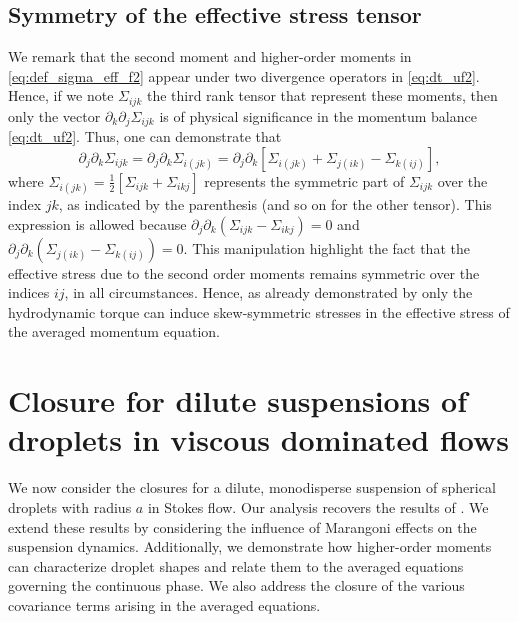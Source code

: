 \subsection{Symmetry of the effective stress tensor}
We remark that the second moment and higher-order moments in \ref{eq:def_sigma_eff_f2} appear under two divergence operators in \ref{eq:dt_uf2}. 
Hence, if we note $\Sigma_{ijk}$ the third rank tensor that represent these moments, then only the vector $\partial_k \partial_j\Sigma_{ijk}$ is of physical significance in the momentum balance \eqref{eq:dt_uf2}.
Thus, one can demonstrate that \citep{lhuillier1996contribution}
\begin{equation}
    \partial_j \partial_k \Sigma_{ijk}
    = \partial_j \partial_k \Sigma_{i(jk)}
    =
    \partial_j \partial_k \left[
        \Sigma_{i(jk)}
        + \Sigma_{j(ik)}
        - \Sigma_{k(ij)}
    \right],
    \label{eq:sym_proof}
\end{equation}
where $\Sigma_{i(jk)} = \frac{1}{2}[\Sigma_{ijk} + \Sigma_{ikj}]$ represents the symmetric part of $\Sigma_{ijk}$ over the index $jk$, as indicated by the parenthesis (and so on for the other tensor). 
This expression is allowed because $\partial_j \partial_k (\Sigma_{ijk} - \Sigma_{ikj}) = 0$ and $\partial_j \partial_k (\Sigma_{j(ik)} - \Sigma_{k(ij)}) = 0$. 
This manipulation highlight the fact that the effective stress due to the second order moments remains symmetric over the indices $ij$, in all circumstances.
Hence, as already demonstrated by \citet{lhuillier1996contribution} only the hydrodynamic torque can induce skew-symmetric stresses in the effective stress of the averaged momentum equation. 



\section{Closure for dilute suspensions of droplets in viscous dominated flows}
\label{sec:closure}
We now consider the closures for a dilute, monodisperse suspension of spherical droplets with radius $a$ in Stokes flow. 
Our analysis recovers the results of \citet[Appendix B]{zhang1997momentum}. 
We extend these results by considering the influence of Marangoni effects on the suspension dynamics. 
Additionally, we demonstrate how higher-order moments can characterize droplet shapes and relate them to the averaged equations governing the continuous phase. 
We also address the closure of the various covariance terms arising in the averaged equations.

